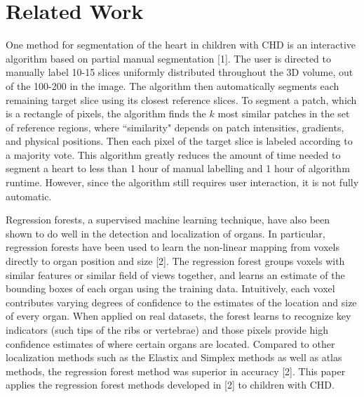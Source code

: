 \section{Related Work}
One method for segmentation of the heart in children with CHD is an interactive algorithm based on partial manual segmentation [1]. The user is directed to manually label 10-15 slices uniformly distributed throughout the 3D volume, out of the 100-200 in the image. The algorithm then automatically segments each remaining target slice using its closest reference slices. To segment a patch, which is a rectangle of pixels, the algorithm finds the $k$ most similar patches in the set of reference regions, where ``similarity" depends on patch intensities, gradients, and physical positions. Then each pixel of the target slice is labeled according to a majority vote. This algorithm greatly reduces the amount of time needed to segment a heart to less than 1 hour of manual labelling and 1 hour of algorithm runtime. However, since the algorithm still requires user interaction, it is not fully automatic.

Regression forests, a supervised machine learning technique, have also been shown to do well in the detection and localization of organs. In particular, regression forests have been used to learn the non-linear mapping from voxels directly to organ position and size [2]. The regression forest groups voxels with similar features or similar field of views together, and learns an estimate of the bounding boxes of each organ using the training data. Intuitively, each voxel contributes varying degrees of confidence to the estimates of the location and size of every organ. When applied on real datasets, the forest learns to recognize key indicators (such tips of the ribs or vertebrae) and those pixels provide high confidence estimates of where certain organs are located. Compared to other localization methods such as the Elastix and Simplex methods as well as atlas methods, the regression forest method was superior in accuracy [2]. This paper applies the regression forest methods developed in [2] to children with CHD.

